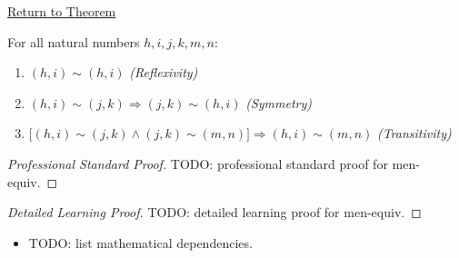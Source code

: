 \newpage
{}
\label{prf:men-equiv}

\begin{remark*}[Return]
\hyperref[thm:men-equiv]{Return to Theorem}
\end{remark*}

\begin{theorem*}
For all natural numbers $h,i,j,k,m,n$:
\begin{enumerate}
  \item[\normalfont(R)] $(h,i) \sim (h,i)$ \hfill\textit{(Reflexivity)}
  \item[\normalfont(S)] $(h,i) \sim (j,k) \Rightarrow (j,k) \sim (h,i)$
    \hfill\textit{(Symmetry)}
  \item[\normalfont(T)] $\bigl[(h,i)\sim(j,k)\wedge(j,k)\sim(m,n)\bigr]
    \Rightarrow (h,i)\sim(m,n)$ \hfill\textit{(Transitivity)}
\end{enumerate}
\end{theorem*}

\begin{proof}[Professional Standard Proof]
\LRAProofBodyStart
TODO: professional standard proof for men-equiv.
\end{proof}

\begin{proof}[Detailed Learning Proof]
\LRAProofBodyStart
TODO: detailed learning proof for men-equiv.
\end{proof}

\begin{remark*}
\end{remark*}

\begin{dependencies}
\begin{itemize}
  \item TODO: list mathematical dependencies.
\end{itemize}
\end{dependencies}

\clearpage
